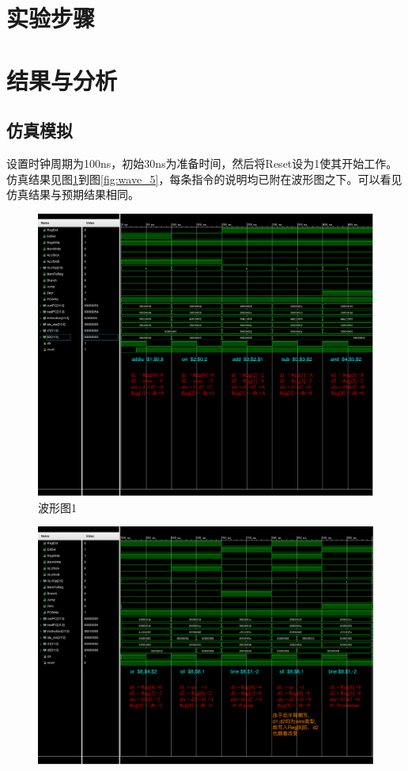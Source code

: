\documentclass[12pt,UTF8]{ctexart}
\begin{document}
\begin{spacing}{1.1}
\section{实验步骤}



\section{结果与分析}
\subsection{仿真模拟}
\qquad 设置时钟周期为100ns，初始30ns为准备时间，然后将Reset设为1使其开始工作。仿真结果见图\ref{fig:wave_1}到图\ref{fig:wave_5}，每条指令的说明均已附在波形图之下。可以看见仿真结果与预期结果相同。
\begin{figure}
\includegraphics[width=\linewidth,trim=0 260 0 0,clip]{fig/FullIns1.pdf}
\caption{波形图1}
\label{fig:wave_1}
\end{figure}
\begin{figure}
\includegraphics[width=\linewidth,trim=0 50 0 0,clip]{fig/FullIns2.pdf}

\end{figure}
\end{spacing}
\end{document}
